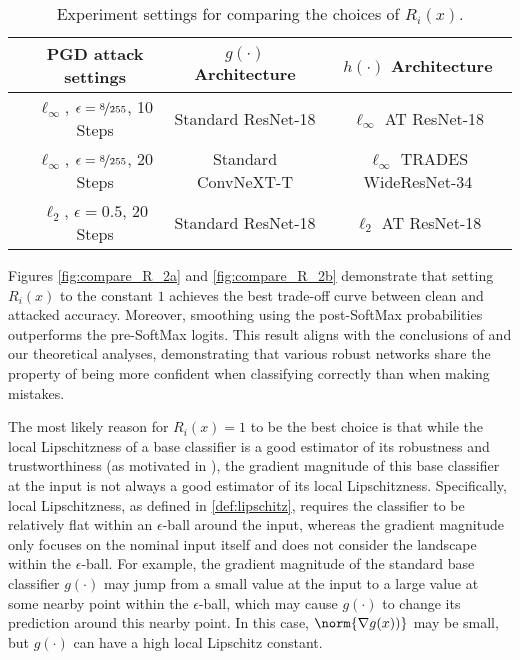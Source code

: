 \documentclass[11pt, letterpaper]{article}
\theoremstyle{plain}
\theoremstyle{definition}
\begin{document}
\begin{table}[t]
	\centering
	\caption{Experiment settings for comparing the choices of $R_i (x)$.}
	\vspace{-1.5mm}
	\label{tab:compare_R_settings}
	\begin{small}
	\begin{tabular}{l|c|c|c}
		\toprule
		& PGD attack settings	& $g (\cdot)$ Architecture	& $h (\cdot)$ Architecture \\
		\midrule
		\Cref{fig:compare_R}    & $\ell_\infty$, $\epsilon = \nicefrac{8}{255}$, 10 Steps	& Standard ResNet-18	& $\ell_\infty$ AT ResNet-18				\\
		\Cref{fig:compare_R_2a} & $\ell_\infty$, $\epsilon = \nicefrac{8}{255}$, 20 Steps	& Standard ConvNeXT-T & $\ell_\infty$ TRADES WideResNet-34		\\
		\Cref{fig:compare_R_2b} & $\ell_2$, $\epsilon = 0.5$, 20 Steps		  		  		& Standard ResNet-18	& $\ell_2$ AT ResNet-18					\\
		\bottomrule
	\end{tabular}
	\end{small}
	\vspace{1.5mm}
\end{table}

Figures \ref{fig:compare_R_2a} and \ref{fig:compare_R_2b} demonstrate that setting $R_i (x)$ to the constant $1$ achieves the best trade-off curve between clean and attacked accuracy. Moreover, smoothing using the post-SoftMax probabilities outperforms the pre-SoftMax logits. This result aligns with the conclusions of  and our theoretical analyses, demonstrating that various robust networks share the property of being more confident when classifying correctly than when making mistakes.

The most likely reason for $R_i (x) = 1$ to be the best choice is that while the local Lipschitzness of a base classifier is a good estimator of its robustness and trustworthiness (as motivated in \citep{Anderson21b}), the gradient magnitude of this base classifier at the input is not always a good estimator of its local Lipschitzness. Specifically, local Lipschitzness, as defined in \cref{def:lipschitz}, requires the classifier to be relatively flat within an $\epsilon$-ball around the input, whereas the gradient magnitude only focuses on the nominal input itself and does not consider the landscape within the $\epsilon$-ball. For example, the gradient magnitude of the standard base classifier $g (\cdot)$ may jump from a small value at the input to a large value at some nearby point within the $\epsilon$-ball, which may cause $g (\cdot)$ to change its prediction around this nearby point. In this case, $\norm{\nabla g(x))}$ may be small, but $g (\cdot)$ can have a high local Lipschitz constant.
\end{document}
